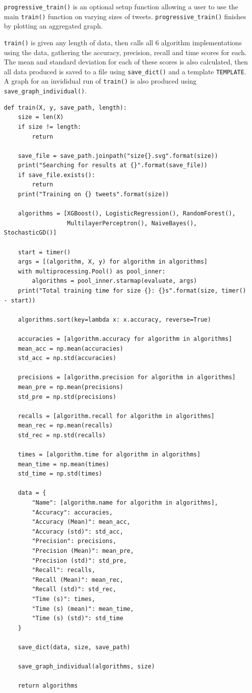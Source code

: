 \documentclass{article}
\begin{document}
\lstinline{progressive_train()} is an optional setup function allowing a user to use the main \lstinline{train()} function on varying sizes of tweets.
\lstinline{progressive_train()} finishes by plotting an aggregated graph.

\lstinline{train()} is given any length of data, then calls all 6 algorithm implementations using the data, gathering the accuracy, precision, recall and time scores for each.
The mean and standard deviation for each of these scores is also calculated, then all data produced is saved to a file using \lstinline{save_dict()} and a template \lstinline{TEMPLATE}.
A graph for an invididual run of \lstinline{train()} is also produced using \lstinline{save_graph_individual()}.

\begin{lstlisting}[caption={Main training/comparison function},captionpos=b]
def train(X, y, save_path, length):
    size = len(X)
    if size != length:
        return

    save_file = save_path.joinpath("size{}.svg".format(size))
    print("Searching for results at {}".format(save_file))
    if save_file.exists():
        return
    print("Training on {} tweets".format(size))

    algorithms = [XGBoost(), LogisticRegression(), RandomForest(),
                  MultilayerPerceptron(), NaiveBayes(), StochasticGD()]

    start = timer()
    args = [(algorithm, X, y) for algorithm in algorithms]
    with multiprocessing.Pool() as pool_inner:
        algorithms = pool_inner.starmap(evaluate, args)
    print("Total training time for size {}: {}s".format(size, timer() - start))

    algorithms.sort(key=lambda x: x.accuracy, reverse=True)

    accuracies = [algorithm.accuracy for algorithm in algorithms]
    mean_acc = np.mean(accuracies)
    std_acc = np.std(accuracies)

    precisions = [algorithm.precision for algorithm in algorithms]
    mean_pre = np.mean(precisions)
    std_pre = np.std(precisions)

    recalls = [algorithm.recall for algorithm in algorithms]
    mean_rec = np.mean(recalls)
    std_rec = np.std(recalls)

    times = [algorithm.time for algorithm in algorithms]
    mean_time = np.mean(times)
    std_time = np.std(times)

    data = {
        "Name": [algorithm.name for algorithm in algorithms],
        "Accuracy": accuracies,
        "Accuracy (Mean)": mean_acc,
        "Accuracy (std)": std_acc,
        "Precision": precisions,
        "Precision (Mean)": mean_pre,
        "Precision (std)": std_pre,
        "Recall": recalls,
        "Recall (Mean)": mean_rec,
        "Recall (std)": std_rec,
        "Time (s)": times,
        "Time (s) (mean)": mean_time,
        "Time (s) (std)": std_time
    }

    save_dict(data, size, save_path)

    save_graph_individual(algorithms, size)

    return algorithms
\end{lstlisting}
\end{document}
